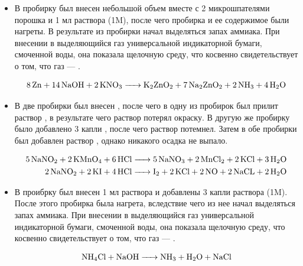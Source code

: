 \documentclass[a4paper, 12pt]{article}
\begin{document}
\begin{itemize}
\item

В пробирку был внесен небольшой объем  вместе с 2 микрошпателями порошка  и 1 мл раствора  (1M), после чего пробирка и ее содержимое были нагреты. В результате из пробирки начал выделяться запах аммиака. При внесении в выделяющийся газ универсальной индикаторной бумаги, смоченной воды, она показала щелочную среду, что косвенно свидетельствует о том, что газ --- .

\begin{equation}
	\ce{8 Zn + 14 NaOH + 2 KNO3 -> K2ZnO2 + 7Na2ZnO2 + 2NH3 + 4H2O}
\end{equation}

\item

В две пробирки был внесен , после чего в одну из пробирок был прилит раствор , в результате чего раствор  потерял окраску. В другую же пробирку было добавлено 3 капли , после чего раствор потемнел. Затем в обе пробирки был добавлен раствор , однако никакого осадка не выпало. 


\begin{align}
	\ce{5NaNO2 + 2KMnO4 + 6HCl -> 5 NaNO3 + 2 MnCl2 + 2 KCl + 3H2O}\\
	\ce{2 NaNO2 + 2 KI + 4 HCl -> I2 + 2 KCl + 2NO + 2 NaCL + 2H2O}
\end{align}

\item 


В проибрку был внесен 1 мл раствора  и добавлены 3 капли раствора  (1M). После этого пробирка была нагрета, вследствие чего из нее начал выделяться запах аммиака. При внесении в выделяющийся газ универсальной индикаторной бумаги, смоченной воды, она показала щелочную среду, что косвенно свидетельствует о том, что газ --- .

\begin{equation}
	\ce{NH4Cl + NaOH -> NH3 + H2O + NaCl}
\end{equation}
\end{itemize}
\end{document}
